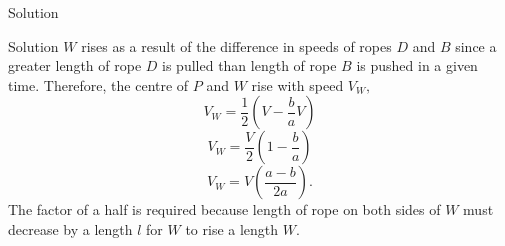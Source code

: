 \documentclass{beamer}
\begin{document}
    \begin{frame}{Solution}
        \begin{exampleblock}{Solution}
            $W$ rises as a result of the difference in speeds of ropes $D$ and $B$ since a greater length of rope $D$ is pulled than length of rope $B$ is pushed in a given time. 
            Therefore, the centre of $P$ and $W$ rise with speed $V_W,$
            \[V_W = \frac{1}{2}\left( V - \frac{b}{a} V\right) \]
            \[V_W = \frac{V}{2} \left(1 - \frac{b}{a}\right) \]
            \[V_W = V \left( \frac{a-b}{2a}\right).\]\pause
            The factor of a half is required because length of rope on both sides of $W$ must decrease by a length $l$ for $W$ to rise a length $W$. 
        \end{exampleblock}
    \end{frame}
    
\end{document}
